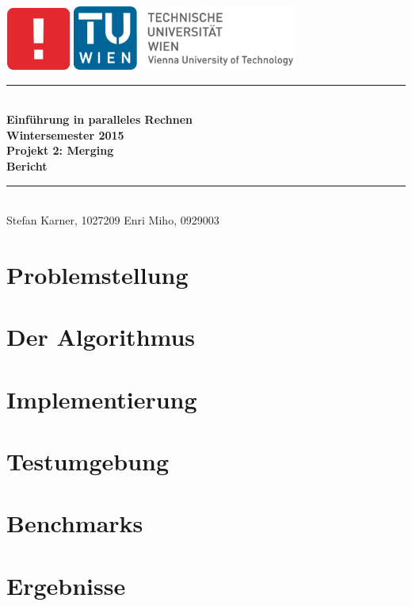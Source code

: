 \documentclass[a4paper,12pt]{article}
\begin{document}
\thispagestyle{empty}
\begin{center}
 \includegraphics[width=0.16\textwidth]{resources/informatik_logo}
\includegraphics[width=0.55\textwidth]{resources/tu_logo}\\[1cm]
\newcommand{\HRule}{\rule{\linewidth}{0.5mm}}
\HRule \\[0.4cm]
{ \Large \bfseries Einführung in paralleles Rechnen\\
Wintersemester 2015\\ [0.2cm]
Projekt 2: Merging \\ [0.2cm]
Bericht}\\[0.4cm]

\HRule \\[1.5cm]
{\large
Stefan Karner, 1027209 \hfill Enri Miho, 0929003
}
\end{center}

\newpage
\tableofcontents
\newpage
\section{Problemstellung}
	

\section{Der Algorithmus}
	

\section{Implementierung}
	

\section{Testumgebung}
	
	
\section{Benchmarks}
	
	
\section{Ergebnisse}
	

\newpage


\end{document}

